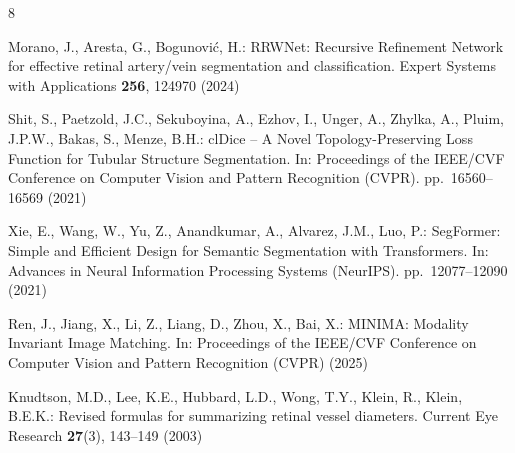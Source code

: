 \documentclass[runningheads]{llncs}
\begin{document}
%
\begin{thebibliography}{8}

Morano, J., Aresta, G., Bogunovi\'c, H.: RRWNet: Recursive Refinement
Network for effective retinal artery/vein segmentation and classification.
Expert Systems with Applications \textbf{256}, 124970 (2024)

Shit, S., Paetzold, J.C., Sekuboyina, A., Ezhov, I., Unger, A., Zhylka, A.,
Pluim, J.P.W., Bakas, S., Menze, B.H.: clDice -- A Novel Topology-Preserving
Loss Function for Tubular Structure Segmentation. In: Proceedings of the
IEEE/CVF Conference on Computer Vision and Pattern Recognition (CVPR).
pp.\ 16560--16569 (2021)

Xie, E., Wang, W., Yu, Z., Anandkumar, A., Alvarez, J.M., Luo, P.: SegFormer:
Simple and Efficient Design for Semantic Segmentation with Transformers. In:
Advances in Neural Information Processing Systems (NeurIPS). pp.\
12077--12090 (2021)

Ren, J., Jiang, X., Li, Z., Liang, D., Zhou, X., Bai, X.: MINIMA: Modality
Invariant Image Matching. In: Proceedings of the IEEE/CVF Conference on
Computer Vision and Pattern Recognition (CVPR) (2025)

Knudtson, M.D., Lee, K.E., Hubbard, L.D., Wong, T.Y., Klein, R., Klein,
B.E.K.: Revised formulas for summarizing retinal vessel diameters. Current
Eye Research \textbf{27}(3), 143--149 (2003)

\end{thebibliography}
\end{document}
